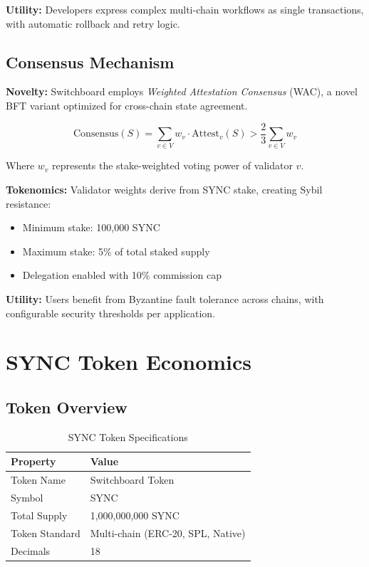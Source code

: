 \documentclass[12pt,a4paper]{article}
\begin{document}
\textbf{Utility:} Developers express complex multi-chain workflows as single transactions, with automatic rollback and retry logic.

\subsection{Consensus Mechanism}

\textbf{Novelty:} Switchboard employs \textit{Weighted Attestation Consensus} (WAC), a novel BFT variant optimized for cross-chain state agreement.

\begin{equation}
\text{Consensus}(S) = \sum_{v \in V} w_v \cdot \text{Attest}_v(S) > \frac{2}{3} \sum_{v \in V} w_v
\end{equation}

Where $w_v$ represents the stake-weighted voting power of validator $v$.

\textbf{Tokenomics:} Validator weights derive from SYNC stake, creating Sybil resistance:
\begin{itemize}
    \item Minimum stake: 100,000 SYNC
    \item Maximum stake: 5\% of total staked supply
    \item Delegation enabled with 10\% commission cap
\end{itemize}

\textbf{Utility:} Users benefit from Byzantine fault tolerance across chains, with configurable security thresholds per application.

\section{SYNC Token Economics}

\subsection{Token Overview}

\begin{table}[h]
\centering
\begin{tabular}{ll}
\toprule
\textbf{Property} & \textbf{Value} \\
\midrule
Token Name & Switchboard Token \\
Symbol & SYNC \\
Total Supply & 1,000,000,000 SYNC \\
Token Standard & Multi-chain (ERC-20, SPL, Native) \\
Decimals & 18 \\
\bottomrule
\end{tabular}
\caption{SYNC Token Specifications}
\end{table}
\end{document}
